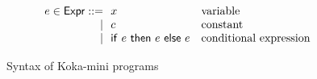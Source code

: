 \begin{figure}[H]
	\begin{mdframed}
		\small
		\[\begin{array}{r@{\ \ }l@{\quad}ll}
			e  \in \expr ::= & x           & \mbox{variable}\\
			\mid & c     & \mbox{constant} \\
			\mid & \icond e e e  & \mbox{conditional expression} \\
			
			
		\end{array}\]
	\end{mdframed}
	\caption{\label{fig:koka-mini-syntax}%
    Syntax of Koka-mini programs}
\end{figure}

